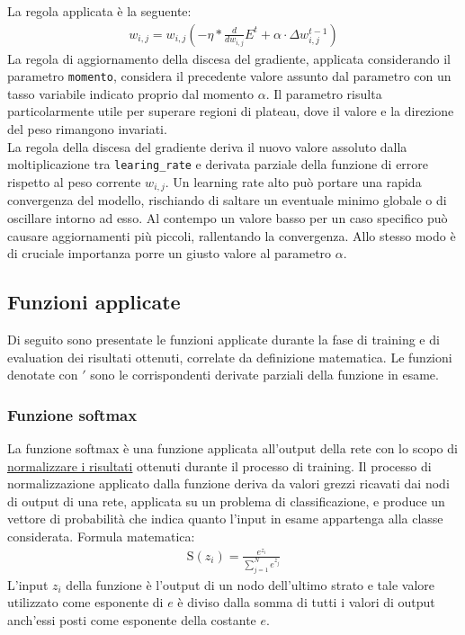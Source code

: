 La regola applicata è la seguente:
\begin{align*}
w_{i,j} = w_{i,j} (- \eta * \frac{d}{dw_{i,j}}E^t + \alpha \cdot \Delta w_{i,j}^{t-1})
\end{align*}
La regola di aggiornamento della discesa del gradiente, applicata considerando il parametro \texttt{momento}, considera il precedente valore assunto dal parametro con un tasso variabile indicato proprio dal momento $\alpha$. Il parametro risulta particolarmente utile per superare regioni di plateau, dove il valore e la direzione del peso rimangono invariati.  \\
La regola della discesa del gradiente deriva il nuovo valore assoluto dalla moltiplicazione tra \texttt{learing\_rate} e derivata parziale della funzione di errore rispetto al peso corrente $w_{i,j}$. Un learning rate alto può portare una rapida convergenza del modello, rischiando di saltare un eventuale minimo globale o di oscillare intorno ad esso. Al contempo un valore basso per un caso specifico può causare aggiornamenti più piccoli, rallentando la convergenza. Allo stesso modo è di cruciale importanza porre un giusto valore al parametro $\alpha$.

\subsection{Funzioni applicate}
Di seguito sono presentate le funzioni applicate durante la fase di training e di evaluation dei risultati ottenuti, correlate da definizione matematica. Le funzioni denotate con $'$ sono le corrispondenti derivate parziali della funzione in esame.
\subsubsection{Funzione softmax}
La funzione softmax è una funzione applicata all'output della rete con lo scopo di \underline{normalizzare i risultati} ottenuti durante il processo di training. Il processo di normalizzazione applicato dalla funzione deriva da valori grezzi ricavati dai nodi di output di una rete, applicata su un problema di classificazione, e produce un vettore di probabilità che indica quanto l'input in esame appartenga alla classe considerata. Formula matematica:
\begin{align*}
\text{S}(z_i) = \frac{e^{z_i}}{\sum_{j=1}^{N} e^{z_j}}
\end{align*}
L'input $z_i$ della funzione è l'output di un nodo dell'ultimo strato e tale valore utilizzato come esponente di $e$ è diviso dalla somma di tutti i valori di output anch'essi posti come esponente della costante $e$.
